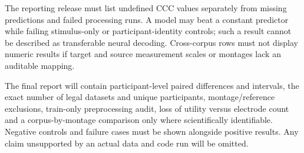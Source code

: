 The reporting release must list undefined CCC values separately from
missing predictions and failed processing runs. A model may beat a
constant predictor while failing stimulus-only or participant-identity
controls; such a result cannot be described as transferable neural
decoding. Cross-corpus rows must not display numeric results if target
and source measurement scales or montages lack an auditable mapping.

The final report will contain participant-level paired differences and intervals, the exact number of legal datasets and unique participants, montage/reference exclusions, train-only preprocessing audit, loss of utility versus electrode count and a corpus-by-montage comparison only where scientifically identifiable. Negative controls and failure cases must be shown alongside positive results. Any claim unsupported by an actual data and code run will be omitted.
